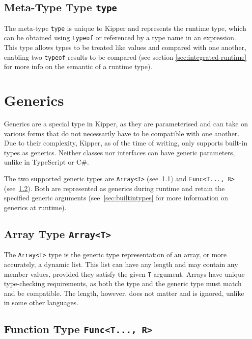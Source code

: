 \subsection{Meta-Type Type \lstinline|type|}

The meta-type \lstinline|type| is unique to Kipper and represents the runtime type, which can be obtained using \lstinline|typeof| or referenced by a type name in an expression. This type allows types to be treated like values and compared with one another, enabling two \lstinline|typeof| results to be compared (see section \ref{sec:integrated-runtime} for more info on the semantic of a runtime type).

\section{Generics}
\label{sec:kipper-generics}

Generics are a special type in Kipper, as they are parameterised and can take on various forms that do not necessarily have to be compatible with one another. Due to their complexity, Kipper, as of the time of writing, only supports built-in types as generics. Neither classes nor interfaces can have generic parameters, unlike in TypeScript or C\#.

The two supported generic types are \lstinline|Array<T>| (see~\ref{sec:array-type}) and \lstinline|Func<T..., R>| (see~\ref{sec:func-type}). Both are represented as generics during runtime and retain the specified generic arguments (see~\ref{sec:builtintypes} for more information on generics at runtime).

\subsection{Array Type \lstinline|Array<T>|}
\label{sec:array-type}

The \lstinline|Array<T>| type is the generic type representation of an array, or more accurately, a dynamic list. This list can have any length and may contain any member values, provided they satisfy the given \lstinline|T| argument. Arrays have unique type-checking requirements, as both the type and the generic type must match and be compatible. The length, however, does not matter and is ignored, unlike in some other languages.

\subsection{Function Type \lstinline|Func<T..., R>|}
\label{sec:func-type}


